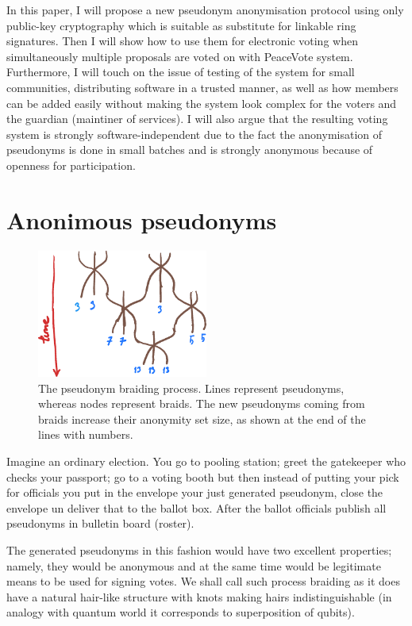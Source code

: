 \documentclass[12pt,a4paper]{article}
\let\Oldsection\section
\renewcommand{\section}{\FloatBarrier\Oldsection}
\let\oldincludegraphics\includegraphics
\renewcommand{\includegraphics}[1]{\oldincludegraphics[width=0.5\textwidth]{#1}}
\begin{document}
In this paper, I will propose a new pseudonym anonymisation protocol using only public-key cryptography which is suitable as substitute for linkable ring signatures. Then I will show how to use them for electronic voting when simultaneously multiple proposals are voted on with PeaceVote system. Furthermore, I will touch on the issue of testing of the system for small communities, distributing software in a trusted manner, as well as how members can be added easily without making the system look complex for the voters and the guardian (maintiner of services). I will also argue that the resulting voting system is strongly software-independent due to the fact the anonymisation of pseudonyms is done in small batches and is strongly anonymous because of openness for participation.\par
\section{Anonimous pseudonyms}
\begin{figure}
\centering
\includegraphics{figures/braiding}
\caption{The pseudonym braiding process. Lines represent pseudonyms, whereas nodes represent braids. The new pseudonyms coming from braids increase their anonymity set size, as shown at the end of the lines with numbers.}
\end{figure}
\par
Imagine an ordinary election. You go to pooling station; greet the gatekeeper who checks your passport; go to a voting booth but then instead of putting your pick for officials you put in the envelope your just generated pseudonym, close the envelope un deliver that to the ballot box. After the ballot officials publish all pseudonyms in bulletin board (roster).\par
The generated pseudonyms in this fashion would have two excellent properties; namely, they would be anonymous and at the same time would be legitimate means to be used for signing votes. We shall call such process braiding as it does have a natural hair-like structure with knots making hairs indistinguishable (in analogy with quantum world it corresponds to superposition of qubits).\par
\end{document}
